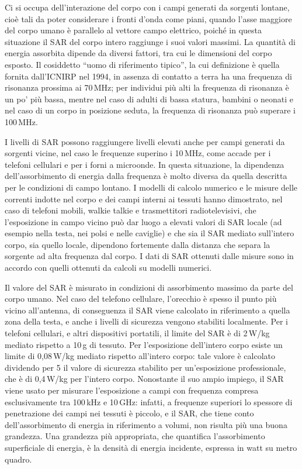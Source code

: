 \documentclass{report}
\newcommand{\virgolette}[1]{``#1''}
\numberwithin{equation}{section}
\numberwithin{figure}{section}
\begin{document}
Ci si occupa dell'interazione del corpo con i campi generati da sorgenti lontane, cioè tali da poter considerare i fronti d'onda come piani, quando l'asse maggiore del corpo umano è parallelo al vettore campo elettrico, poiché in questa situazione il SAR del corpo intero raggiunge i suoi valori massimi. La quantità di energia assorbita dipende da diversi fattori, tra cui le dimensioni del corpo esposto. Il cosiddetto \virgolette{uomo di riferimento tipico}, la cui definizione è quella fornita dall'ICNIRP nel 1994, in assenza di contatto a terra ha una frequenza di risonanza prossima ai 70\,MHz; per individui più alti la frequenza di risonanza è un po’ più bassa, mentre nel caso di adulti di bassa statura, bambini o neonati e nel caso di un corpo in posizione seduta, la frequenza di risonanza può superare i 100\,MHz.

I livelli di SAR possono raggiungere livelli elevati anche per campi generati da sorgenti vicine, nel caso le frequenze superino i 10\,MHz, come accade per i telefoni cellulari e per i forni a microonde. In questa situazione, la dipendenza dell'assorbimento di energia dalla frequenza è molto diversa da quella descritta per le condizioni di campo lontano. I modelli di calcolo numerico e le misure delle correnti indotte nel corpo e dei campi interni ai tessuti hanno dimostrato, nel caso di telefoni mobili, walkie talkie e trasmettitori radiotelevisivi, che l’esposizione in campo vicino può dar luogo a elevati valori di SAR locale (ad esempio nella testa, nei polsi e nelle caviglie) e che sia il SAR mediato sull'intero corpo, sia quello locale, dipendono fortemente dalla distanza che separa la sorgente ad alta frequenza dal corpo. I dati di SAR ottenuti dalle misure sono in accordo con quelli ottenuti da calcoli su modelli numerici.

Il valore del SAR è misurato in condizioni di assorbimento massimo da parte del corpo umano. Nel caso del telefono cellulare, l'orecchio è spesso il punto più vicino all'antenna, di conseguenza il SAR viene calcolato in riferimento a quella zona della testa, e anche i livelli di sicurezza vengono stabiliti localmente. Per i telefoni cellulari, e altri dispositivi portatili, il limite del SAR è di 2\,W/kg mediato rispetto a 10\,g di tessuto. Per l'esposizione dell'intero corpo esiste un limite di 0,08\,W/kg mediato rispetto all'intero corpo: tale valore è calcolato dividendo per 5 il valore di sicurezza stabilito per un'esposizione professionale, che è di 0,4\,W/kg per l'intero corpo. Nonostante il suo ampio impiego, il SAR viene usato per misurare l'esposizione a campi con frequenza compresa esclusivamente tra 100\,kHz e 10\,GHz: infatti, a frequenze superiori lo spessore di penetrazione dei campi nei tessuti è piccolo, e il SAR, che tiene conto dell'assorbimento di energia in riferimento a volumi, non risulta più una buona grandezza. Una grandezza più appropriata, che quantifica l'assorbimento superficiale di energia, è la densità di energia incidente, espressa in watt su metro quadro.
\end{document}
